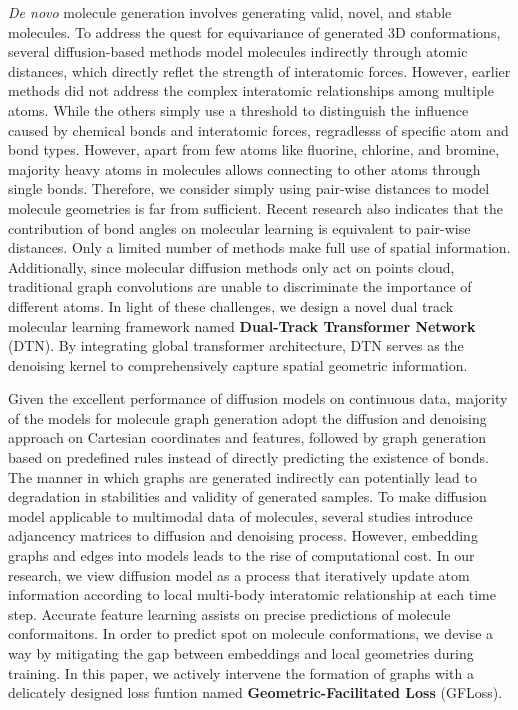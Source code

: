 \documentclass[letterpaper]{article} %
\begin{document}
{\itshape De novo} molecule generation involves generating valid, novel, and stable molecules. To address the quest for equivariance of generated 3D conformations, several diffusion-based methods \cite{edm_22_hoogeboom,mdm_23_huang} model molecules indirectly through atomic distances, which directly reflet the strength of interatomic forces. However, earlier methods \cite{edm_22_hoogeboom} did not address the complex interatomic relationships among multiple atoms. While the others \cite{mdm_23_huang} simply use a threshold to distinguish the influence caused by chemical bonds and interatomic forces, regradlesss of specific atom and bond types. However, apart from few atoms like fluorine, chlorine, and bromine, majority heavy atoms in molecules allows connecting to other atoms through single bonds. Therefore, we consider simply using pair-wise distances to model molecule geometries is far from sufficient. Recent research \cite{moleformer_23_yuan} also indicates that the contribution of bond angles on molecular learning is equivalent to pair-wise distances. Only a limited number of methods make full use of spatial information. Additionally, since molecular diffusion methods only act on points cloud, traditional graph convolutions are unable to discriminate the importance of different atoms. In light of these challenges, we design a novel dual track molecular learning framework named \textbf{Dual-Track Transformer Network} (DTN). By integrating global transformer architecture, DTN serves as the denoising kernel to comprehensively capture spatial geometric information. 

Given the excellent performance of diffusion models on continuous data, majority of the models for molecule graph generation adopt the diffusion and denoising approach on Cartesian coordinates and features, followed by graph generation based on predefined rules instead of directly predicting the existence of bonds. The manner in which graphs are generated indirectly can potentially lead to degradation in stabilities and validity of generated samples. To make diffusion model applicable to multimodal data of molecules, several studies \cite{edpgnn_20_niu,digress_22_vignac,midi_23_vignac} introduce adjancency matrices to diffusion and denoising process. However, embedding graphs and edges into models leads to the rise of computational cost. In our research, we view diffusion model as a process that iteratively update atom information according to local multi-body interatomic relationship at each time step. Accurate feature learning assists on precise predictions of molecule conformaitons. In order to predict spot on molecule conformations, we devise a way by mitigating the gap between embeddings and local geometries during training. In this paper, we actively intervene the formation of graphs with a delicately designed loss funtion named \textbf{Geometric-Facilitated Loss} (GFLoss). 
\end{document}
